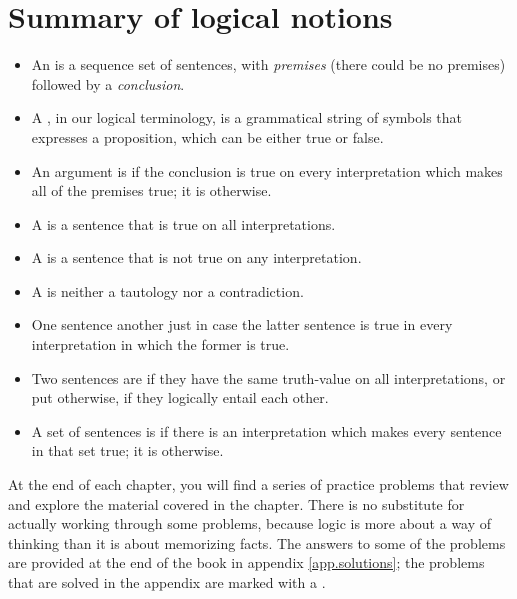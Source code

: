 \section*{Summary of logical notions}
\begin{itemize}

\item An  is a sequence set of sentences, with \emph{premises} (there could be no premises) followed by a \emph{conclusion}.

\item A , in our logical terminology, is a grammatical string of symbols that expresses a proposition, which can be either true or false.

\item An argument is  if the conclusion is true on every interpretation which makes all of the premises true; it is  otherwise.

\item A  is a sentence that is true on all interpretations.

\item A  is a sentence that is not true on any interpretation.

\item A  is neither a tautology nor a contradiction.

\item One sentence  another just in case the latter sentence is true in every interpretation in which the former is true.

\item Two sentences are  if they have the same truth-value on all interpretations, or put otherwise, if they logically entail each other.

\item A set of sentences is  if there is an interpretation which makes every sentence in that set true; it is  otherwise.

\end{itemize}


\iffalse %

\practiceproblems
At the end of each chapter, you will find a series of practice problems that review and explore the material covered in the chapter. There is no substitute for actually working through some problems, because logic is more about a way of thinking than it is about memorizing facts. The answers to some of the problems are provided at the end of the book in appendix \ref{app.solutions}; the problems that are solved in the appendix are marked with a \solutions.

